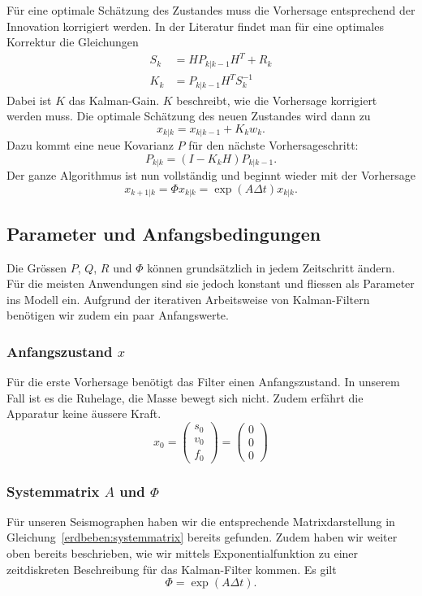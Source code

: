 Für eine optimale Schätzung des Zustandes muss die Vorhersage entsprechend der Innovation korrigiert werden.
In der Literatur findet man für eine optimales Korrektur die Gleichungen
\begin{align*}
{S_{k}} &={H}{P_{k|k-1}}{H}^T+{R_{k}}
\\
{K_{k}} &= {P_{k|k-1}} {H^T}{S_{k}^{-1}}
\end{align*}
Dabei ist $K$ das Kalman-Gain.
$K$ beschreibt, wie die Vorhersage korrigiert werden muss.
Die optimale Schätzung des neuen Zustandes wird dann zu
\[
{x_{k|k}}={x_{k|k-1}}+{K_{k}}{w_{k}}.
\] 
Dazu kommt eine neue Kovarianz $P$ für den nächste Vorhersageschritt:
\[
{P_{k|k}}=(I-{K_{k}}{H}){P_{k|k-1}}. 
\] 
Der ganze Algorithmus ist nun vollständig und beginnt wieder mit der Vorhersage 
\[
{x_{k+1|k}}=\Phi{x_{k|k}}= \exp(A\Delta t){x_{k|k}}.
\] 


\subsection{Parameter und Anfangsbedingungen}
Die Grössen $P$, $Q$, $R$ und $\Phi$ können grundsätzlich in jedem Zeitschritt ändern.
Für die meisten Anwendungen sind sie jedoch konstant und fliessen als Parameter ins Modell ein.
Aufgrund der iterativen Arbeitsweise von Kalman-Filtern benötigen wir zudem ein paar Anfangswerte.

\subsubsection*{Anfangszustand $x$}
Für die erste Vorhersage benötigt das Filter einen Anfangszustand.
In unserem Fall ist es die Ruhelage, die Masse bewegt sich nicht. 
Zudem erfährt die Apparatur keine äussere Kraft.
\[ {x_0 }= \left( \begin{array}{c} {s_0}\\ {v_0}\\{f_0}\end{array}\right) = \left( \begin{array}{c} 0\\ 0\\ 0\end{array}\right) \]

\subsubsection*{Systemmatrix $A$ und $\Phi$}
Für unseren Seismographen haben wir die entsprechende Matrixdarstellung
in Gleichung~\eqref{erdbeben:systemmatrix} bereits gefunden.
Zudem haben wir weiter oben bereits beschrieben,
wie wir mittels Exponentialfunktion zu einer zeitdiskreten Beschreibung für das Kalman-Filter kommen.
Es gilt
\[ \Phi = \exp(A \Delta t) .\]


